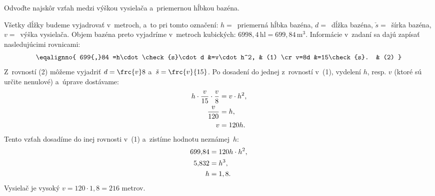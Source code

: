 {%
\napad
Odvoďte najskôr vzťah medzi výškou vysielača a~priemernou hĺbkou bazéna.

\riesenie
Všetky dĺžky budeme vyjadrovať v~metroch, a~to pri tomto označení:
$h=$~priemerná hĺbka bazéna, $d=$~dĺžka bazéna, $\check{s}=$~šírka bazéna,
$v=$~výška vysielača.
Objem bazéna preto vyjadríme v~metroch kubických:
$6998{,}4\,\text{hl}=699{,}84\,\text{m}^3$.
Informácie v~zadaní sa dajú zapísať nasledujúcimi rovnicami:
$$
\eqalignno{
699{,}84 =h\cdot\check{s}\cdot d &=v\cdot h^2, & (1) \cr
v=8d &=15\check{s}. & (2) }
$$
Z~rovností (2) môžeme vyjadriť $d=\frc{v}8$ a~$\check{s}=\frc{v}{15}$.
Po dosadení do jednej z~rovností v~(1), vydelení $h$, resp. $v$ (ktoré sú
určite nenulové) a~úprave dostávame:
$$
\aligned
h\cdot\frac{v}{15}\cdot\frac{v}8 &=v\cdot h^2, \\
\frac{v}{120} &=h, \\
v&=120h.
\endaligned
$$
Tento vzťah dosadíme do inej rovnosti v~(1) a~zistíme hodnotu neznámej~$h$:
$$
\aligned
699{,}84 &=120h\cdot h^2, \\
5{,}832 &=h^3, \\
h &=1,8.
\endaligned
$$
Vysielač je vysoký $v=120\cdot 1{,}8=216$ metrov.
}

